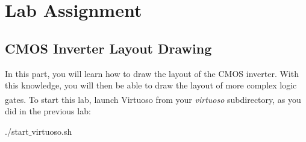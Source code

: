 \section{Lab Assignment}
\subsection{CMOS Inverter Layout Drawing}
In this part, you will learn how to draw the layout of the CMOS inverter. With this knowledge, you will then be able to draw the layout of more complex logic gates. To start this lab, launch Virtuoso\textsuperscript{\tiny\textregistered} from your \textit{virtuoso} subdirectory, as you did in the previous lab:
\begin{codeline}
	./start$\_$virtuoso.sh
\end{codeline}

